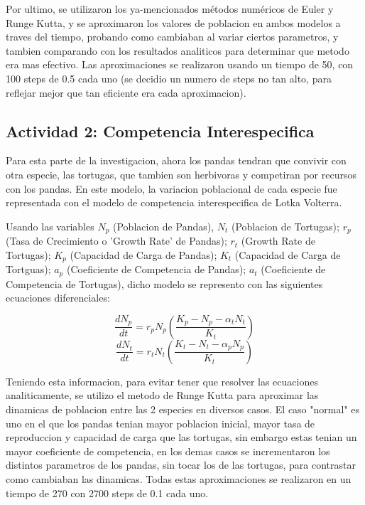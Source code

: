 \documentclass{article}
\begin{document}
\noindent Por ultimo, se utilizaron los ya-mencionados métodos numéricos de Euler y Runge Kutta, y se aproximaron los valores de poblacion en ambos modelos a traves del tiempo, probando como cambiaban al variar ciertos parametros, y tambien comparando con los resultados analiticos para determinar que metodo era mas efectivo. Las aproximaciones se realizaron usando un tiempo de 50, con 100 steps de 0.5 cada uno (se decidio un numero de steps no tan alto, para reflejar mejor que tan eficiente era cada aproximacion).



\subsection*{Actividad 2: Competencia Interespecifica}
\noindent Para esta parte de la investigacion, ahora los pandas tendran que convivir con otra especie, las tortugas, que tambien son herbivoras y competiran por recursos con los pandas. En este modelo, la variacion poblacional de cada especie fue representada con el modelo de competencia interespecifica de Lotka Volterra.\vspace{1\baselineskip}

\noindent Usando las variables $N_p$ (Poblacion de Pandas), $N_t$ (Poblacion de Tortugas); $r_p$ (Tasa de Crecimiento o 'Growth Rate' de Pandas); $r_t$ (Growth Rate de Tortugas); $K_p$ (Capacidad de Carga de Pandas); $K_t$ (Capacidad de Carga de Tortguas); $a_p$ (Coeficiente de Competencia de Pandas); $a_t$ (Coeficiente de Competencia de Tortugas), dicho modelo se represento con las siguientes ecuaciones diferenciales: \vspace{0.5\baselineskip}

\setlength{\baselineskip}{1\baselineskip}
\[\frac{dN_p}{dt} = r_p N_p \left( \frac{K_p - N_p - \alpha_{t} N_t}{K_t} \right)\]
\[\frac{dN_t}{dt} = r_t N_t \left( \frac{K_t - N_t - \alpha_{p} N_p}{K_t} \right)\]
\vspace{0.75\baselineskip}

\noindent Teniendo esta informacion, para evitar tener que resolver las ecuaciones analiticamente, se utilizo el metodo de Runge Kutta para aproximar las dinamicas de poblacion entre las 2 especies en diversos casos. El caso "normal" es uno en el que los pandas tenian mayor poblacion inicial, mayor tasa de reproduccion y capacidad de carga que las tortugas, sin embargo estas tenian un mayor coeficiente de competencia, en los demas casos se incrementaron los distintos parametros de los pandas, sin tocar los de las tortugas, para contrastar como cambiaban las dinamicas. Todas estas aproximaciones se realizaron en un tiempo de 270 con 2700 steps de 0.1 cada uno.
\vspace{1\baselineskip}
\end{document}
